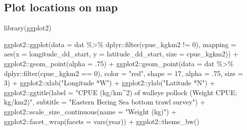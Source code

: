 \documentclass[
  letterpaper,
  oneside,
  open=any]{scrbook}
\newenvironment{Shaded}{\begin{snugshade}}{\end{snugshade}}
\newcommand{\AttributeTok}[1]{\textcolor[rgb]{0.40,0.45,0.13}{#1}}
\newcommand{\DecValTok}[1]{\textcolor[rgb]{0.68,0.00,0.00}{#1}}
\newcommand{\FunctionTok}[1]{\textcolor[rgb]{0.28,0.35,0.67}{#1}}
\newcommand{\NormalTok}[1]{\textcolor[rgb]{0.00,0.23,0.31}{#1}}
\newcommand{\SpecialCharTok}[1]{\textcolor[rgb]{0.37,0.37,0.37}{#1}}
\newcommand{\StringTok}[1]{\textcolor[rgb]{0.13,0.47,0.30}{#1}}
\begin{document}
\renewcommand*{\arraystretch}{1}

\subsection{Plot locations on map}\label{plot-locations-on-map}

\begin{Shaded}
\begin{Highlighting}[]
\FunctionTok{library}\NormalTok{(ggplot2)}

\NormalTok{ggplot2}\SpecialCharTok{::}\FunctionTok{ggplot}\NormalTok{(}\AttributeTok{data =}\NormalTok{ dat }\SpecialCharTok{\%\textgreater{}\%}\NormalTok{ dplyr}\SpecialCharTok{::}\FunctionTok{filter}\NormalTok{(cpue\_kgkm2 }\SpecialCharTok{!=} \DecValTok{0}\NormalTok{), }
                \AttributeTok{mapping =} \FunctionTok{aes}\NormalTok{(}\AttributeTok{x =}\NormalTok{ longitude\_dd\_start, }
                              \AttributeTok{y =}\NormalTok{ latitude\_dd\_start, }
                              \AttributeTok{size =}\NormalTok{ cpue\_kgkm2)) }\SpecialCharTok{+} 
\NormalTok{  ggplot2}\SpecialCharTok{::}\FunctionTok{geom\_point}\NormalTok{(}\AttributeTok{alpha =}\NormalTok{ .}\DecValTok{75}\NormalTok{) }\SpecialCharTok{+}
\NormalTok{  ggplot2}\SpecialCharTok{::}\FunctionTok{geom\_point}\NormalTok{(}\AttributeTok{data =}\NormalTok{ dat }\SpecialCharTok{\%\textgreater{}\%}\NormalTok{ dplyr}\SpecialCharTok{::}\FunctionTok{filter}\NormalTok{(cpue\_kgkm2 }\SpecialCharTok{==} \DecValTok{0}\NormalTok{), }
                      \AttributeTok{color =} \StringTok{"red"}\NormalTok{, }
                      \AttributeTok{shape =} \DecValTok{17}\NormalTok{,}
                      \AttributeTok{alpha =}\NormalTok{ .}\DecValTok{75}\NormalTok{,}
                      \AttributeTok{size =} \DecValTok{3}\NormalTok{) }\SpecialCharTok{+}
\NormalTok{  ggplot2}\SpecialCharTok{::}\FunctionTok{xlab}\NormalTok{(}\StringTok{"Longitude *W"}\NormalTok{) }\SpecialCharTok{+}
\NormalTok{  ggplot2}\SpecialCharTok{::}\FunctionTok{ylab}\NormalTok{(}\StringTok{"Latitude *N"}\NormalTok{) }\SpecialCharTok{+}
\NormalTok{  ggplot2}\SpecialCharTok{::}\FunctionTok{ggtitle}\NormalTok{(}\AttributeTok{label =} \StringTok{"CPUE (kg/km\^{}2) of walleye pollock (Weight CPUE; kg/km2)"}\NormalTok{, }
                   \AttributeTok{subtitle =} \StringTok{"Eastern Bering Sea bottom trawl survey"}\NormalTok{) }\SpecialCharTok{+}
\NormalTok{  ggplot2}\SpecialCharTok{::}\FunctionTok{scale\_size\_continuous}\NormalTok{(}\AttributeTok{name =} \StringTok{"Weight (kg)"}\NormalTok{) }\SpecialCharTok{+} 
\NormalTok{  ggplot2}\SpecialCharTok{::}\FunctionTok{facet\_wrap}\NormalTok{(}\AttributeTok{facets =} \FunctionTok{vars}\NormalTok{(year)) }\SpecialCharTok{+} 
\NormalTok{  ggplot2}\SpecialCharTok{::}\FunctionTok{theme\_bw}\NormalTok{()}
\end{Highlighting}
\end{Shaded}
\end{document}
